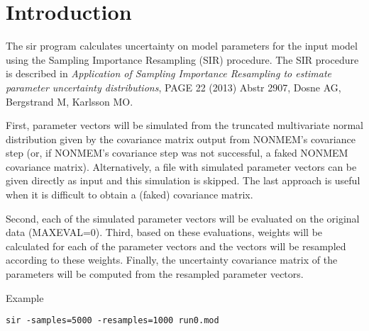 



\maketitle


\section{Introduction}
The sir program calculates uncertainty
on model parameters for the input model using the Sampling Importance Resampling (SIR) procedure.
The SIR procedure is described in
\emph{Application of Sampling Importance Resampling to estimate parameter uncertainty distributions}, 
PAGE 22 (2013) Abstr 2907, Dosne AG, Bergstrand M, Karlsson MO. 

First, parameter vectors will be simulated from the truncated multivariate normal distribution 
given by the covariance matrix output from NONMEM's covariance step
(or, if NONMEM's covariance step was not successful, a faked NONMEM covariance matrix).
Alternatively, a file with simulated parameter vectors can be given directly as input and this simulation is skipped. The last approach is useful when it is
difficult to obtain a (faked) covariance matrix.

Second, each of the simulated parameter vectors will be evaluated on the original data (MAXEVAL=0).
Third, based on these evaluations, weights will be calculated for each of the parameter vectors and the vectors 
will be resampled according to these weights. Finally, the uncertainty covariance matrix of the parameters 
will be computed from the resampled parameter vectors.

Example
\begin{verbatim}
sir -samples=5000 -resamples=1000 run0.mod
\end{verbatim}

